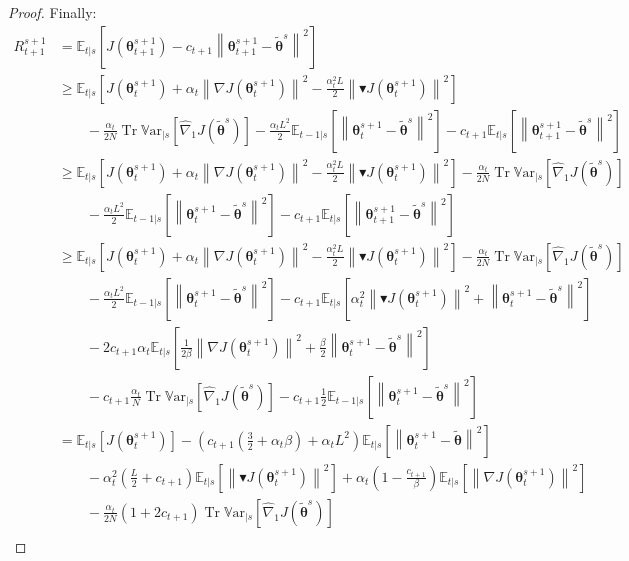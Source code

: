 \documentclass{article}
\theoremstyle{remark}
\theoremstyle{definition}
\DeclareMathOperator{\Tr}{Tr}
\newcommand{\norm}[2][\infty]{\left\|#2\right\|_{#1}}
\newcommand{\vtheta}{\boldsymbol{\theta}}
\newcommand{\gradJ}[1]{\nabla J(#1)}
\newcommand{\gradApp}[2]{\widehat{\nabla}_{#2}J(#1)}
\newcommand{\Ets}[2][t]{\mathbb{E}_{#1\vert s}\left[#2\right]}
\newcommand{\Varts}[2][t]{{\mathbb{V}\text{ar}}_{#1\vert s}\left[#2\right]}
\newcommand{\gradBlack}[1]{\blacktriangledown J(#1)}
\begin{document}
\begin{proof}
Finally:
\begin{align}
	R_{t+1}^{s+1} &= \Ets{J(\vtheta_{t+1}^{s+1}) - c_{t+1}\norm[]{\vtheta_{t+1}^{s+1}-\tilde{\vtheta}^s}^2} \nonumber\\
	&\geq	\Ets{J(\vtheta_t^{s+1})+\alpha_t\norm[]{\gradJ{\vtheta_t^{s+1}}}^2 - \frac{\alpha_t^2L}{2}\norm[]{\gradBlack{\vtheta_t^{s+1}}}^2} \nonumber\\
	&\qquad-
	\frac{\alpha_t}{2N}\Tr\Varts[]{\gradApp{\tilde{\vtheta}^s}{1}} -\frac{\alpha_tL^2}{2}\Ets[t-1]{\norm[]{\vtheta_t^{s+1} - \tilde{\vtheta}^s}^2}
	-c_{t+1}\Ets{\norm[]{\vtheta_{t+1}^{s+1}-\tilde{\vtheta}^s}^2} \label{eq:17}\\
	&\geq \Ets{J(\vtheta_t^{s+1})+\alpha_t\norm[]{\gradJ{\vtheta_t^{s+1}}}^2 - \frac{\alpha_t^2L}{2}\norm[]{\gradBlack{\vtheta_t^{s+1}}}^2} 
	-\frac{\alpha_t}{2N}\Tr\Varts[]{\gradApp{\tilde{\vtheta}^s}{1}} \nonumber\\
	&\qquad -\frac{\alpha_tL^2}{2}\Ets[t-1]{\norm[]{\vtheta_t^{s+1} - \tilde{\vtheta}^s}^2}
	-c_{t+1}\Ets{\norm[]{\vtheta_{t+1}^{s+1}-\tilde{\vtheta}^s}^2} \nonumber\\
	&\geq \Ets{J(\vtheta_t^{s+1})+\alpha_t\norm[]{\gradJ{\vtheta_t^{s+1}}}^2 - \frac{\alpha_t^2L}{2}\norm[]{\gradBlack{\vtheta_t^{s+1}}}^2} 
	-\frac{\alpha_t}{2N}\Tr\Varts[]{\gradApp{\tilde{\vtheta}^s}{1}} \nonumber\\
	&\qquad -\frac{\alpha_tL^2}{2}\Ets[t-1]{\norm[]{\vtheta_t^{s+1} - \tilde{\vtheta}^s}^2} -c_{t+1}\Ets{\alpha_t^2\norm[]{\gradBlack{\vtheta_t^{s+1}}}^2+\norm[]{\vtheta_t^{s+1}-\tilde{\vtheta}^s}^2}
	\nonumber\\
	&\qquad-2c_{t+1}\alpha_t\Ets{\frac{1}{2\beta}\norm[]{\gradJ{\vtheta_t^{s+1}}}^2+\frac{\beta}{2}\norm[]{\vtheta_t^{s+1}-\tilde{\vtheta}^s}^2} \nonumber\\ 
	&\qquad
	-c_{t+1}\frac{\alpha_t}{N}\Tr\Varts[]{\gradApp{\tilde{\vtheta}^s}{1}} -c_{t+1}\frac{1}{2}\Ets[t-1]{\norm[]{\vtheta_t^{s+1}-\tilde{\vtheta}^s}^2} \label{eq:18}\\
	&= \Ets{J(\vtheta_t^{s+1})} - \left(c_{t+1}\left(\frac{3}{2}+\alpha_t\beta\right)+\alpha_tL^2\right)\Ets{\norm[]{\vtheta_{t}^{s+1}-\tilde{\vtheta}}^2} \nonumber\\
	&\qquad-\alpha_t^2\left(\frac{L}{2}+c_{t+1}\right)\Ets{\norm[]{\gradBlack{\vtheta_t^{s+1}}}^2}
	+\alpha_t\left(1-\frac{c_{t+1}}{\beta}\right)\Ets{\norm[]{\gradJ{\vtheta_t^{s+1}}}^2} \nonumber\\
	&\qquad-\frac{\alpha_t}{2N}\left(1+2c_{t+1}\right)\Tr\Varts[]{\gradApp{\tilde{\vtheta}^s}{1}} \nonumber\\

\end{align}
\end{proof}
\end{document}
